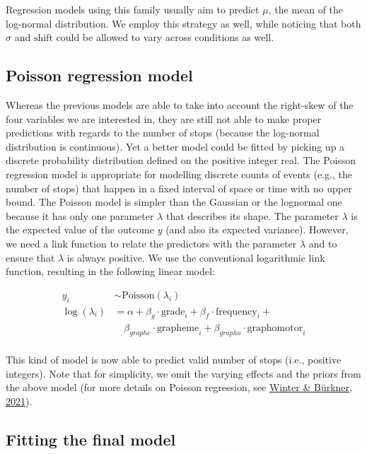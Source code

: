 \documentclass[
  11pt,
  english,
  ,doc,mask,floatsintext]{apa6}
\begin{document}
Regression models using this family usually aim to predict \(\mu\), the mean of the log-normal distribution. We employ this strategy as well, while noticing that both \(\sigma\) and \(\text{shift}\) could be allowed to vary across conditions as well.

\hypertarget{poisson-regression-model}{%
\subsection{Poisson regression model}\label{poisson-regression-model}}

Whereas the previous models are able to take into account the right-skew of the four variables we are interested in, they are still not able to make proper predictions with regards to the number of stops (because the log-normal distribution is continuous). Yet a better model could be fitted by picking up a discrete probability distribution defined on the positive integer real. The Poisson regression model is appropriate for modelling discrete counts of events (e.g., the number of stops) that happen in a fixed interval of space or time with no upper bound. The Poisson model is simpler than the Gaussian or the lognormal one because it has only one parameter \(\lambda\) that describes its shape. The parameter \(\lambda\) is the expected value of the outcome \(y\) (and also its expected variance). However, we need a link function to relate the predictors with the parameter \(\lambda\) and to ensure that \(\lambda\) is always positive. We use the conventional logarithmic link function, resulting in the following linear model:

\[
\begin{aligned}
y_{i} &\sim \mathrm{Poisson}(\lambda_{i})\\
\log(\lambda_{i}) &= \alpha + \beta_{g} \cdot \text{grade}_{i} + \beta_{f} \cdot \text{frequency}_{i} +\\ &\quad  \beta_{graphe} \cdot \text{grapheme}_{i} + \beta_{grapho} \cdot \text{graphomotor}_{i}\\
\end{aligned}
\]

This kind of model is now able to predict valid number of stops (i.e., positive integers). Note that for simplicity, we omit the varying effects and the priors from the above model (for more details on Poisson regression, see \protect\hyperlink{ref-winter_poisson_2021}{Winter \& Bürkner, 2021}).

\hypertarget{fitting-the-final-model}{%
\subsection{Fitting the final model}\label{fitting-the-final-model}}
\end{document}
